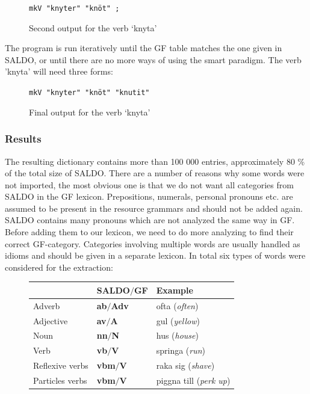 \documentclass[10pt, a4paper]{article}
\begin{document}
\begin{figure}[h]
\begin{center}
\verb-mkV "knyter" "knöt" ;-
\caption{Second output for the verb `knyta'}
\label{fig:saldoknyt2}
\end{center}
\end{figure}

The program is run iteratively until the GF table matches the one given in SALDO,
or until there are no more ways of using the smart paradigm. The verb 'knyta'
will need three forms:\\

\begin{figure}[h]
\begin{center}
\verb-mkV "knyter" "knöt" "knutit"-\\
\caption{Final output for the verb `knyta'}
\label{fig:saldoknyt3}
\end{center}
\end{figure}


\subsubsection{Results}
\label{sec:saldoRes}
The resulting dictionary contains more than 100 000 entries, approximately 80 \% 
of the total size of SALDO.
There are a number of reasons why some words were not imported,
the most obvious one is that we do not want all categories from
SALDO in the GF lexicon. Prepositions, 
numerals, 
personal pronouns etc.
are assumed to be present in the resource grammars and should not be added again.
SALDO contains many pronouns which
are not analyzed the same way in GF. 
Before adding them to our lexicon, we need to do more analyzing to find their
correct GF-category. 
Categories involving multiple words 
are usually handled as idioms and should be given in a separate lexicon. In
total six types of words were considered for the extraction: \\

\begin{figure}[h]
\begin{tabular}{|l|ll|}
\hline
& SALDO$/$GF & Example \\
\hline
 Adverb & \textbf{ab}$/$\textbf{Adv} & ofta (\emph{often})\\
 Adjective&\textbf{av}$/$\textbf{A} & gul (\emph{yellow})\\
 Noun & \textbf{nn}$/$\textbf{N} & hus (\emph{house})\\
 Verb & \textbf{vb}$/$\textbf{V} & springa (\emph{run})\\
 Reflexive verbs &\textbf{vbm}$/$\textbf{V} & raka sig (\emph{shave})\\
 Particles verbs &\textbf{vbm}$/$\textbf{V}  &  piggna till (\emph{perk up})\\
\hline
\end{tabular}
\caption{}
\end{figure}
\end{document}
